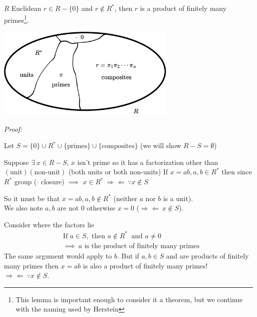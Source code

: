 \begin{lemma}
$R$ Euclidean $r\in R-\{0\}$ and $r\not\in R^*$, then $r$ is a product of finitely many primes\footnote{This lemma is important enough to consider it a theorem, but we continue with the naming used by Herstein}. \\ \steezybreak
\begin{center}
    \includegraphics[width=0.65\textwidth]{Figures/UnitsPrimesComposites.png}
\end{center}
\textit{Proof: } \\ \steezybreak

Let $S= \{0\} \cup R^* \cup \{\text{primes}\}\cup \{\text{composites}\}$ (we will show $R-S=\emptyset$)\\ \steezybreak

\noindent Suppose $\exists \ x\in R-S$, $x$ isn't prime so it has a factorization other than $(\text{unit})(\text{non-unit})$ (both units or both non-units)
If $x=ab, a,b \in R^*$ then since $R^*$ group ($\cdot$ closure) $\implies$ $x\in R^* \ \Rightarrow \Leftarrow \ \because x \not\in S$\\ \steezybreak

\noindent So it must be that $x=ab, a,b \not\in R^*$ (neither $a$ nor $b$ is a unit). \\
We also note $a,b$ are not $0$ otherwise $x=0$ ($\Rightarrow \Leftarrow \ x\not\in S$). \\ \steezybreak

Consider where the factors lie
\begin{align*}
    &\text{If }a\in S, \text{ then }a \not \in R^* \ \text{ and }a\neq 0 \\
    &\implies \ a \text{ is the product of finitely many primes}
\end{align*}
The same argument would apply to $b$. But if $a,b \in S$ and are products of finitely many primes then $x=ab$ is also a product of finitely many primes! $\Rightarrow \Leftarrow \ \because x\not\in S$. \\


\end{lemma}

